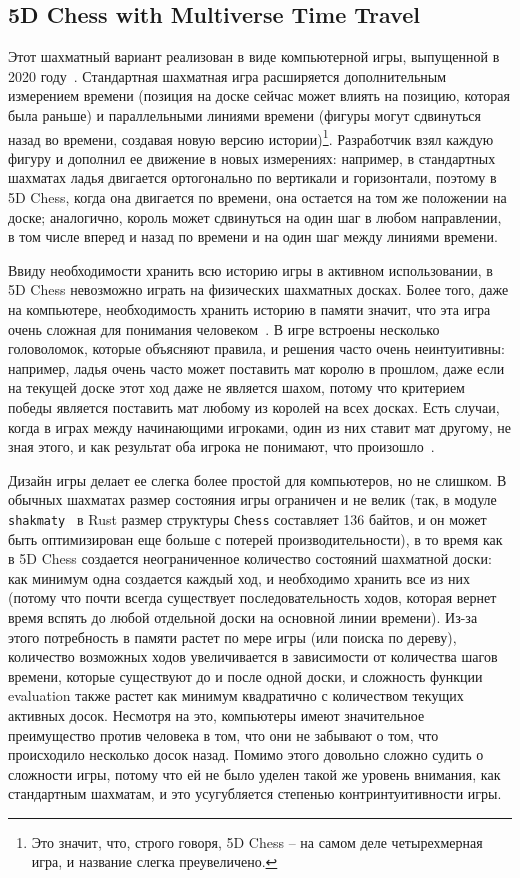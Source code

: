 \documentclass{article}
\begin{document}
\subsection{5D Chess with Multiverse Time Travel}

Этот шахматный вариант реализован в виде компьютерной игры, выпущенной в 2020 году~\cite{5dchess-steam}.
Стандартная шахматная игра расширяется дополнительным измерением времени (позиция на доске сейчас может влиять на позицию, которая была раньше)
и параллельными линиями времени (фигуры могут сдвинуться назад во времени, создавая новую версию истории)\footnote{
    Это значит, что, строго говоря, 5D Chess -- на самом деле четырехмерная игра,
    и название слегка преувеличено.
}.
Разработчик взял каждую фигуру и дополнил ее движение в новых измерениях: 
например, в стандартных шахматах ладья двигается ортогонально по вертикали и горизонтали,
поэтому в 5D Chess, когда она двигается по времени, она остается на том же положении на доске;
аналогично, король может сдвинуться на один шаг в любом направлении, в том числе вперед и назад по времени
и на один шаг между линиями времени.

Ввиду необходимости хранить всю историю игры в активном использовании,
в 5D Chess невозможно играть на физических шахматных досках.
Более того, даже на компьютере, необходимость хранить историю в памяти
значит, что эта игра очень сложная для понимания человеком~\cite{5dchess-review}.
В игре встроены несколько головоломок, которые объясняют правила,
и решения часто очень неинтуитивны:
например, ладья очень часто может поставить мат королю в прошлом,
даже если на текущей доске этот ход даже не является шахом,
потому что критерием победы является поставить мат любому из королей на всех досках.
Есть случаи, когда в играх между начинающими игроками,
один из них ставит мат другому, не зная этого,
и как результат оба игрока не понимают, что произошло~\cite{5dchess-rtgame}.

Дизайн игры делает ее слегка более простой для компьютеров, но не слишком.
В обычных шахматах размер состояния игры ограничен и не велик
(так, в модуле \texttt{shakmaty}~\cite{shakmaty-crate} в Rust размер структуры \texttt{Chess} составляет 136 байтов,
и он может быть оптимизирован еще больше с потерей производительности),
в то время как в 5D Chess создается неограниченное количество состояний шахматной доски:
как минимум одна создается каждый ход,
и необходимо хранить все из них
(потому что почти всегда существует последовательность ходов,
которая вернет время вспять до любой отдельной доски на основной линии времени).
Из-за этого потребность в памяти растет по мере игры (или поиска по дереву),
количество возможных ходов увеличивается в зависимости от количества шагов времени, которые существуют до и после одной доски,
и сложность функции evaluation также растет как минимум квадратично с количеством текущих активных досок.
Несмотря на это, компьютеры имеют значительное преимущество против человека в том,
что они не забывают о том, что происходило несколько досок назад.
Помимо этого довольно сложно судить о сложности игры,
потому что ей не было уделен такой же уровень внимания, как стандартным шахматам,
и это усугубляется степенью контринтуитивности игры. 
\end{document}
